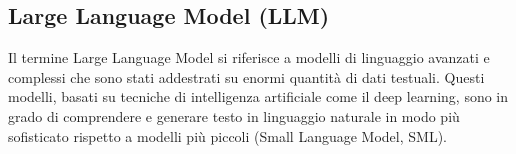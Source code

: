 \hypertarget{sec:LLM}{}
\subsection*{Large Language Model (LLM)}
Il termine Large Language Model si riferisce a modelli di linguaggio avanzati e complessi che sono stati addestrati su enormi quantità di dati testuali. 
Questi modelli, basati su tecniche di intelligenza artificiale come il deep learning, sono in grado di comprendere e generare testo in linguaggio naturale 
in modo più sofisticato rispetto a modelli più piccoli (Small Language Model, SML).

\newpage